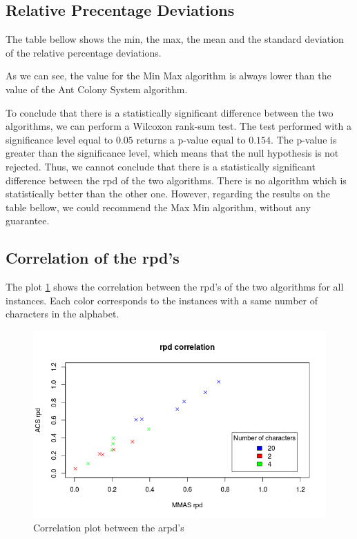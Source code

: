 \documentclass{article}
\begin{document}
\subsection{Relative Precentage Deviations}

The table bellow shows the min, the max, the mean and the standard deviation of the relative percentage deviations.

As we can see, the value for the Min Max algorithm is always lower than the value of the Ant Colony System algorithm. \newline

To conclude that there is a statistically significant difference between the two algorithms, we can perform a Wilcoxon rank-sum test.
The test performed with a significance level equal to $0.05$ returns a p-value equal to $0.154$.
The p-value is greater than the significance level, which means that the null hypothesis is not rejected.
Thus, we cannot conclude that there is a statistically significant difference between the rpd of the two algorithms.
There is no algorithm which is statistically better than the other one.
However, regarding the results on the table bellow, we could recommend the Max Min algorithm, without any guarantee.

\subsection{Correlation of the rpd's}

The plot \ref{fig:corr} shows the correlation between the rpd's of the two algorithms for all instances.
Each color corresponds to the instances with a same number of characters in the alphabet. \newline

\begin{figure}
    \centering
        \includegraphics[scale=0.5]{correl}
    \caption{Correlation plot between the arpd's}
    \label{fig:corr}
\end{figure}
\end{document}
